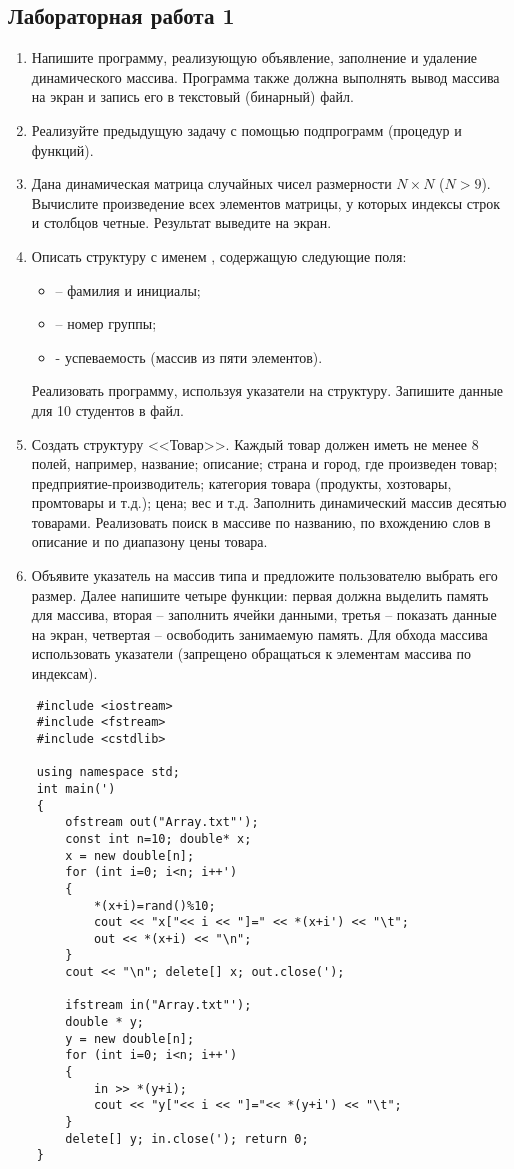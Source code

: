 \subsection{Лабораторная работа 1}
\begin{enumerate}[leftmargin=*]
    \item Напишите программу, реализующую объявление, заполнение и удаление динамического массива. Программа также должна выполнять вывод массива на экран и запись его в текстовый (бинарный) файл.
    \item Реализуйте предыдущую задачу с помощью подпрограмм (процедур и функций).
    \item Дана динамическая матрица случайных чисел размерности $N\times N$ ($N>9$). Вычислите произведение всех элементов матрицы, у которых индексы строк и столбцов четные. Результат выведите на экран.
    \item Описать структуру с именем , содержащую следующие поля:
        \begin{itemize}
            \item {} – фамилия и инициалы;
            \item {} – номер группы;
            \item {} - успеваемость (массив из пяти элементов).
        \end{itemize}
    Реализовать программу, используя указатели на структуру. Запишите данные для 10 студентов в файл.
    \item Создать структуру <<Товар>>. Каждый товар должен иметь не менее 8 полей, например, название; описание; страна и город, где произведен товар; предприятие-производитель; категория товара (продукты, хозтовары, промтовары и т.д.); цена; вес и т.д. Заполнить динамический массив десятью товарами. Реализовать поиск в массиве по названию, по вхождению слов в описание и по диапазону цены товара.
    \item Объявите указатель на массив типа  и предложите пользователю выбрать его размер. Далее напишите четыре функции: первая должна выделить память для массива, вторая – заполнить ячейки данными, третья – показать данные на экран, четвертая – освободить занимаемую память. Для обхода массива использовать указатели (запрещено обращаться к элементам массива по индексам).
\end{enumerate}
\begin{lstlisting}
    #include <iostream>
    #include <fstream>
    #include <cstdlib>

    using namespace std;
    int main(')
    {
        ofstream out("Array.txt"');
        const int n=10; double* x;
        x = new double[n];
        for (int i=0; i<n; i++')
        {
            *(x+i)=rand()%10;
            cout << "x["<< i << "]=" << *(x+i') << "\t";
            out << *(x+i) << "\n";
        }
        cout << "\n"; delete[] x; out.close(');

        ifstream in("Array.txt"');
        double * y;
        y = new double[n];
        for (int i=0; i<n; i++')
        {
            in >> *(y+i);
            cout << "y["<< i << "]="<< *(y+i') << "\t";
        }
        delete[] y; in.close('); return 0;
    }
\end{lstlisting}
